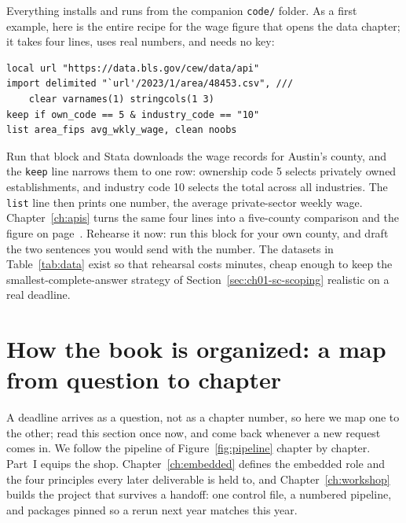 Everything installs and runs from the companion \texttt{code/} folder. As a first example, here is the entire recipe for the wage figure that opens the data chapter; it takes four lines, uses real numbers, and needs no key:
\par
{\footnotesize
\begin{verbatim}
local url "https://data.bls.gov/cew/data/api"
import delimited "`url'/2023/1/area/48453.csv", ///
    clear varnames(1) stringcols(1 3)
keep if own_code == 5 & industry_code == "10"
list area_fips avg_wkly_wage, clean noobs
\end{verbatim}
}
Run that block and Stata downloads the wage records for Austin's county, and the \texttt{keep} line narrows them to one row: ownership code 5 selects privately owned establishments, and industry code 10 selects the total across all industries. The \texttt{list} line then prints one number, the average private-sector weekly wage. Chapter~\ref{ch:apis} turns the same four lines into a five-county comparison and the figure on page~\pageref{fig:qcew}. Rehearse it now: run this block for your own county, and draft the two sentences you would send with the number. The datasets in Table~\ref{tab:data} exist so that rehearsal costs minutes, cheap enough to keep the smallest-complete-answer strategy of Section~\ref{sec:ch01-sc-scoping} realistic on a real deadline.

\section{How the book is organized: a map from question to chapter}
A deadline arrives as a question, not as a chapter number, so here we map one to the other; read this section once now, and come back whenever a new request comes in. We follow the pipeline of Figure~\ref{fig:pipeline} chapter by chapter. Part~I equips the shop. Chapter~\ref{ch:embedded} defines the embedded role and the four principles every later deliverable is held to, and Chapter~\ref{ch:workshop} builds the project that survives a handoff: one control file, a numbered pipeline, and packages pinned so a rerun next year matches this year.

